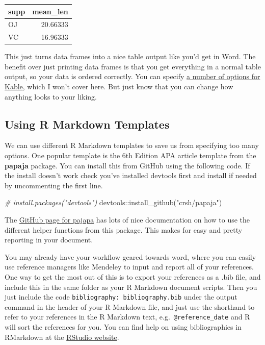 \documentclass[
]{book}
\newenvironment{Shaded}{\begin{snugshade}}{\end{snugshade}}
\newcommand{\CommentTok}[1]{\textcolor[rgb]{0.56,0.35,0.01}{\textit{#1}}}
\newcommand{\FunctionTok}[1]{\textcolor[rgb]{0.00,0.00,0.00}{#1}}
\newcommand{\NormalTok}[1]{#1}
\newcommand{\SpecialCharTok}[1]{\textcolor[rgb]{0.00,0.00,0.00}{#1}}
\newcommand{\StringTok}[1]{\textcolor[rgb]{0.31,0.60,0.02}{#1}}
\begin{document}
\begin{tabular}{l|r}
\hline
supp & mean\_len\\
\hline
OJ & 20.66333\\
\hline
VC & 16.96333\\
\hline
\end{tabular}

This just turns data frames into a nice table output like you'd get in Word. The benefit over just printing data frames is that you get everything in a normal table output, so your data is ordered correctly. You can specify \href{https://haozhu233.github.io/kableExtra/awesome_table_in_html.html}{a number of options for Kable}, which I won't cover here. But just know that you can change how anything looks to your liking.

\hypertarget{using-r-markdown-templates}{%
\subsection{Using R Markdown Templates}\label{using-r-markdown-templates}}

We can use different R Markdown templates to save us from specifying too many options. One popular template is the 6th Edition APA article template from the \textbf{papaja} package. You can install this from GitHub using the following code. If the install doesn't work check you've installed devtools first and install if needed by uncommenting the first line.

\begin{Shaded}
\begin{Highlighting}[]
\CommentTok{\# install.packages("devtools")}
\NormalTok{devtools}\SpecialCharTok{::}\FunctionTok{install\_github}\NormalTok{(}\StringTok{"crsh/papaja"}\NormalTok{)}
\end{Highlighting}
\end{Shaded}

The \href{https://github.com/crsh/papaja}{GitHub page for pajapa} has lots of nice documentation on how to use the different helper functions from this package. This makes for easy and pretty reporting in your document.

You may already have your workflow geared towards word, where you can easily use reference managers like Mendeley to input and report all of your references. One way to get the most out of this is to export your references as a .bib file, and include this in the same folder as your R Markdown document scripts. Then you just include the code \texttt{bibliography:\ bibliography.bib} under the output command in the header of your R Markdown file, and just use the shorthand to refer to your references in the R Markdown text, e.g.~\texttt{@reference\_date} and R will sort the references for you. You can find help on using bibliographies in RMarkdown at the \href{https://rmarkdown.rstudio.com/authoring_bibliographies_and_citations.html}{RStudio website}.
\end{document}
